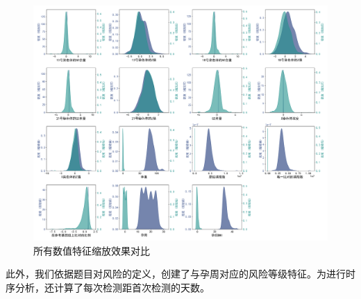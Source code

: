 \begin{figure}[h!]
\centering
\includegraphics[width=1\textwidth]{figs/2模型准备/图6_所有数值特征缩放效果对比}
\caption{所有数值特征缩放效果对比}
\label{fig:所有数值特征缩放效果对比}
\end{figure}


此外，我们依据题目对风险的定义，创建了与孕周对应的风险等级特征。为进行时序分析，还计算了每次检测距首次检测的天数。